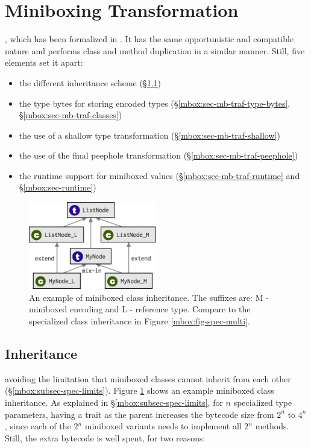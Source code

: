 \section{Miniboxing Transformation}
\label{mbox:sec-mb-traf}

, which has been formalized in \cite{iuli-thesis}. It has the same opportunistic and compatible nature and performs class and method duplication in a similar manner. Still, five elements set it apart:

\begin{itemize}
\item the different inheritance scheme (\S\ref{mbox:sec-mb-traf-inheritance})
\item the type bytes for storing encoded types (\S\ref{mbox:sec-mb-traf-type-bytes}, \S\ref{mbox:sec-mb-traf-classes})
\item the use of a shallow type transformation (\S\ref{mbox:sec-mb-traf-shallow})
\item the use of the final peephole transformation (\S\ref{mbox:sec-mb-traf-peephole})
\item the runtime support for miniboxed values (\S\ref{mbox:sec-mb-traf-runtime} and \S\ref{mbox:sec-runtime})
\end{itemize}

\begin{figure}[t]
    \centering
    \includegraphics[width=0.50\textwidth]{diags/mbox-multi.eps}

    \caption[Miniboxed inheritance diagram]{An example of miniboxed class inheritance. The suffixes are: M - miniboxed encoding and L - reference type. Compare to the specialized class inheritance in Figure \ref{mbox:fig-spec-multi}.}
    \label{mbox:fig-mbox-multi}
\end{figure}


\subsection{Inheritance}
\label{mbox:sec-mb-traf-inheritance}
 avoiding the limitation that miniboxed classes cannot  inherit from each other (\S\ref{mbox:subsec-spec-limits}). Figure \ref{mbox:fig-mbox-multi} shows an example miniboxed class inheritance. As explained in \S\ref{mbox:subsec-spec-limits}, for $n$ specialized type parameters, having a trait as the parent increases the bytecode size from $2^n$ to $4^n$, since each of the $2^n$ miniboxed variants needs to implement all $2^n$ methods. Still, the extra bytecode is well spent, for two reasons:

